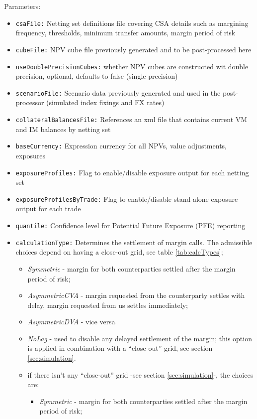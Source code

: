Parameters:
\begin{itemize}
\item {\tt csaFile:} Netting set definitions file covering CSA details such as margining frequency, thresholds, minimum
transfer amounts, margin period of risk
\item {\tt cubeFile:} NPV cube file previously generated and to be post-processed here
\item {\tt useDoublePrecisionCubes:} whether NPV cubes are constructed wit double precision, optional, defaults to false (single precision)
\item {\tt scenarioFile:} Scenario data previously generated and used in the post-processor (simulated index fixings and
FX rates)
\item {\tt collateralBalancesFile:} References an xml file that contains current VM and IM balances by netting set
\item {\tt baseCurrency:} Expression currency for all NPVs, value adjustments, exposures
\item {\tt exposureProfiles:} Flag to enable/disable exposure output for each netting set
\item {\tt exposureProfilesByTrade:} Flag to enable/disable stand-alone exposure output for each trade
\item {\tt quantile:} Confidence level for Potential Future Exposure (PFE) reporting
\item {\tt calculationType:} Determines the settlement of margin calls. The admissible choices depend on having a close-out grid, see table \ref{tab:calcTypes}; \\
  \begin{itemize}
  \item {\em Symmetric} - margin for both counterparties settled after the margin period of risk;
  \item {\em AsymmetricCVA} - margin requested from the counterparty settles with delay,
    margin requested from us settles immediately;
  \item {\em AsymmetricDVA} - vice versa
  \item {\em NoLag} - used to disable any delayed settlement of the margin; this option is applied in combination with a ``close-out'' grid, see section \ref{sec:simulation}.
  \item if there isn't any ``close-out'' grid -see section \ref{sec:simulation}-, the choices are:
    \begin{itemize}
    \item {\em Symmetric} - margin for both counterparties settled after the margin period of risk;

\end{itemize}
\end{itemize}
\end{itemize}
